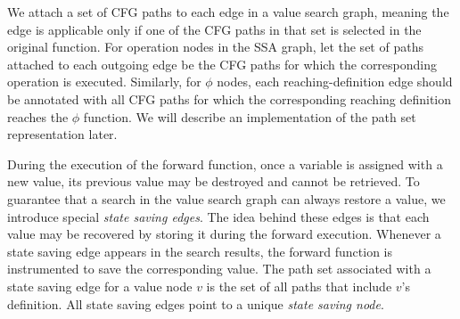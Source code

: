 \documentclass[12pt]{gatech-thesis}
\begin{document}
We attach a set of CFG paths to each edge in a value search graph, meaning the edge is applicable only if one of the CFG paths in that set is selected in the original function.
For operation nodes in the SSA graph, let the set of paths attached to each outgoing edge be the CFG paths for which the corresponding operation is executed. 
Similarly, for $\phi$ nodes, each reaching-definition edge should be annotated with all CFG paths for which the corresponding reaching definition reaches the $\phi$ function. 
We will describe an implementation of the path set representation later.

During the execution of the forward function, once a variable is assigned with a new value, its previous value may be destroyed and cannot be retrieved. To guarantee that a search in the value search graph can always restore a value, we introduce special \emph{state saving edges}. 
The idea behind these edges is that each value may be recovered by storing it during the forward execution. 
Whenever a state saving edge appears in the search results, the forward function is instrumented to save the corresponding value. 
The path set associated with a state saving edge for a value node $v$ is the set of all paths that include $v$'s definition. All state saving edges point to a unique \emph{state saving node}. %

\end{document}
